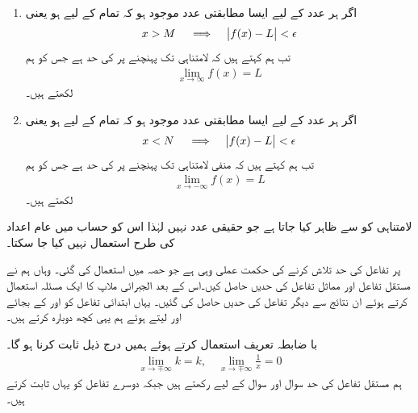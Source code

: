 \begin{enumerate}[1.]
\item
اگر ہر عدد  کے لیے ایسا مطابقتی عدد  موجود ہو کہ تمام   کے لیے  ہو یعنی
\begin{align*}
x>M\quad \implies \quad \abs{f(x)-L}<\epsilon
\end{align*}
 تب ہم کہتے ہیں کہ  لامتناہی تک پہنچنے پر   کی حد  ہے جس کو ہم
\begin{align*}
\lim_{x\to\infty} f(x)=L
\end{align*}
لکھتے ہیں۔
\item
اگر ہر عدد  کے لیے ایسا مطابقتی عدد  موجود ہو کہ تمام   کے لیے  ہو یعنی
\begin{align*}
x<N\quad \implies \quad \abs{f(x)-L}<\epsilon
\end{align*}
 تب ہم کہتے ہیں کہ  منفی لامتناہی تک پہنچنے پر   کی حد  ہے جس کو ہم
\begin{align*}
\lim_{x\to-\infty} f(x)=L
\end{align*}
لکھتے ہیں۔

\end{enumerate}

لامتناہی کو  سے ظاہر کیا جاتا ہے جو حقیقی عدد نہیں   لہٰذا اس کو حساب میں عام اعداد کی طرح استعمال نہیں کیا جا سکتا۔

 پر تفاعل کی حد تلاش کرنے کی حکمت عملی وہی ہے جو حصہ  میں استعمال کی گئی۔ وہاں ہم نے مستقل تفاعل  اور مماثل تفاعل  کی  حدیں حاصل کیں۔اس کے بعد الجبرائی ملاپ کا ایک مسئلہ استعمال کرتے ہوئے ان نتائج سے دیگر تفاعل کی  حدیں حاصل کی گئیں۔ یہاں ابتدائی تفاعل کو  اور  کے بجائے  اور  لیتے ہوئے ہم یہی کچھ دوبارہ کرتے ہیں۔ 

با ضابطہ  تعریف استعمال کرتے ہوئے ہمیں درج ذیل ثابت کرنا ہو گا۔
\begin{align}\label{مساوات_استعمال_معکوس_حد}
\lim_{x\to \mp \infty} k=k,\quad \lim_{x\to \mp \infty}\frac{1}{x}=0
\end{align}
ہم مستقل تفاعل کی حد سوال  اور سوال  کے لیے  رکھتے ہیں جبکہ دوسرے تفاعل کو یہاں ثابت کرتے ہیں۔

